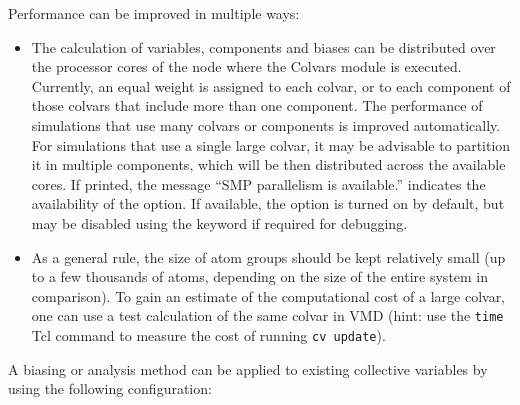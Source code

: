 Performance can be improved in multiple ways:
\begin{itemize}
\item The calculation of variables, components and biases can be distributed over the processor cores of the node where the Colvars module is executed.
  Currently, an equal weight is assigned to each colvar, or to each component of those colvars that include more than one component.
  The performance of simulations that use many colvars or components is improved automatically.
  For simulations that use a single large colvar, it may be advisable to partition it in multiple components, which will be then distributed across the available cores.
  If printed, the message ``SMP parallelism is available.'' indicates the availability of the option.
  If available, the option is turned on by default, but may be disabled using the keyword  if required for debugging.


\item As a general rule, the size of atom groups should be kept relatively small (up to a few thousands of atoms, depending on the size of the entire system in comparison).
To gain an estimate of the computational cost of a large colvar, one can use a test calculation of the same colvar in VMD (hint: use the \texttt{time} Tcl command to measure the cost of running \texttt{cv update}).
\end{itemize}



A biasing or analysis method can be applied to existing collective variables by using the following configuration:

